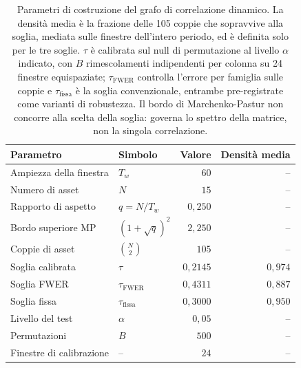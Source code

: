 \begin{table}[H]
\centering
\caption[Parametri del grafo dinamico]{Parametri di costruzione del grafo di correlazione dinamico. La densità media è la frazione delle 105 coppie che sopravvive alla soglia, mediata sulle finestre dell'intero periodo, ed è definita solo per le tre soglie. $\tau$ è calibrata sul null di permutazione al livello $\alpha$ indicato, con $B$ rimescolamenti indipendenti per colonna su 24 finestre equispaziate; $\tau_{\mathrm{FWER}}$ controlla l'errore per famiglia sulle coppie e $\tau_{\mathrm{fissa}}$ è la soglia convenzionale, entrambe pre-registrate come varianti di robustezza. Il bordo di Marchenko-Pastur non concorre alla scelta della soglia: governa lo spettro della matrice, non la singola correlazione.}
\label{tab:graph-params}
\begin{tabular}{@{}llrr@{}}
\toprule
\textbf{Parametro} & \textbf{Simbolo} & \textbf{Valore} & \textbf{Densità media} \\
\midrule
Ampiezza della finestra & $T_w$ & $60$ & -- \\
Numero di asset & $N$ & $15$ & -- \\
Rapporto di aspetto & $q = N/T_w$ & $0{,}250$ & -- \\
Bordo superiore MP & $(1+\sqrt{q})^2$ & $2{,}250$ & -- \\
Coppie di asset & $\binom{N}{2}$ & $105$ & -- \\
\midrule
Soglia calibrata & $\tau$ & $0{,}2145$ & $0{,}974$ \\
Soglia FWER & $\tau_{\mathrm{FWER}}$ & $0{,}4311$ & $0{,}887$ \\
Soglia fissa & $\tau_{\mathrm{fissa}}$ & $0{,}3000$ & $0{,}950$ \\
\midrule
Livello del test & $\alpha$ & $0{,}05$ & -- \\
Permutazioni & $B$ & $500$ & -- \\
Finestre di calibrazione & -- & $24$ & -- \\
\bottomrule
\end{tabular}
\end{table}
